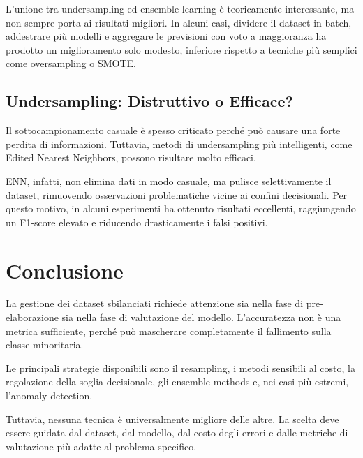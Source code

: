 \documentclass[11pt, a4paper]{article}
\begin{document}
L'unione tra undersampling ed ensemble learning è teoricamente interessante, ma
non sempre porta ai risultati migliori. In alcuni casi, dividere il dataset in
batch, addestrare più modelli e aggregare le previsioni con voto a maggioranza ha
prodotto un miglioramento solo modesto, inferiore rispetto a tecniche più semplici
come oversampling o SMOTE.

\subsection{Undersampling: Distruttivo o Efficace?}

Il sottocampionamento casuale è spesso criticato perché può causare una forte
perdita di informazioni. Tuttavia, metodi di undersampling più intelligenti,
come Edited Nearest Neighbors, possono risultare molto efficaci.

ENN, infatti, non elimina dati in modo casuale, ma pulisce selettivamente il
dataset, rimuovendo osservazioni problematiche vicine ai confini decisionali.
Per questo motivo, in alcuni esperimenti ha ottenuto risultati eccellenti,
raggiungendo un F1-score elevato e riducendo drasticamente i falsi positivi.

\section{Conclusione}

La gestione dei dataset sbilanciati richiede attenzione sia nella fase di
pre-elaborazione sia nella fase di valutazione del modello. L'accuratezza non è
una metrica sufficiente, perché può mascherare completamente il fallimento sulla
classe minoritaria.

Le principali strategie disponibili sono il resampling, i metodi sensibili al
costo, la regolazione della soglia decisionale, gli ensemble methods e, nei casi
più estremi, l'anomaly detection.

Tuttavia, nessuna tecnica è universalmente migliore delle altre. La scelta deve
essere guidata dal dataset, dal modello, dal costo degli errori e dalle metriche
di valutazione più adatte al problema specifico.
\end{document}
